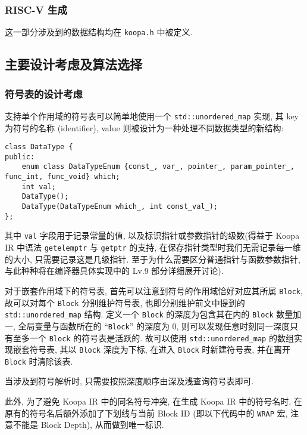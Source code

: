 \documentclass[8pt]{article}
\theoremstyle{compact}
\begin{document}
\subsubsection{RISC-V 生成}

这一部分涉及到的数据结构均在 \texttt{koopa.h} 中被定义.

\subsection{主要设计考虑及算法选择}
\subsubsection{符号表的设计考虑}
支持单个作用域的符号表可以简单地使用一个 \texttt{std::unordered\_map} 实现, 其 key 为符号的名称 (identifier), value 则被设计为一种处理不同数据类型的新结构:
\begin{verbatim}
class DataType {
public:
    enum class DataTypeEnum {const_, var_, pointer_, param_pointer_, func_int, func_void} which;
    int val;
    DataType();
    DataType(DataTypeEnum which_, int const_val_);
};            
\end{verbatim}

其中 \texttt{val} 字段用于记录常量的值, 以及标识指针或参数指针的级数(得益于 Koopa IR 中语法 \texttt{getelemptr} 与 \texttt{getptr} 的支持, 在保存指针类型时我们无需记录每一维的大小, 只需要记录这是几级指针. 至于为什么需要区分普通指针与函数参数指针, 与此种种将在编译器具体实现中的 Lv.9 部分详细展开讨论).

对于嵌套作用域下的符号表, 首先可以注意到符号的作用域恰好对应其所属 \texttt{Block}, 故可以对每个 \texttt{Block} 分别维护符号表, 也即分别维护前文中提到的 \texttt{std::unordered\_map} 结构. 定义一个 \texttt{Block} 的深度为包含其在内的 \texttt{Block} 数量加一, 全局变量与函数所在的 “\texttt{Block}” 的深度为 0, 则可以发现任意时刻同一深度只有至多一个 \texttt{Block} 的符号表是活跃的. 故可以使用 \texttt{std::unordered\_map} 的数组实现嵌套符号表, 其以 \texttt{Block} 深度为下标, 在进入 \texttt{Block} 时新建符号表, 并在离开 \texttt{Block} 时清除该表.

当涉及到符号解析时, 只需要按照深度顺序由深及浅查询符号表即可. 

此外, 为了避免 Koopa IR 中的同名符号冲突, 在生成 Koopa IR 中的符号名时, 在原有的符号名后额外添加了下划线与当前 Block ID (即以下代码中的 \texttt{WRAP} 宏, 注意不能是 Block Depth), 从而做到唯一标识.
\end{document}
